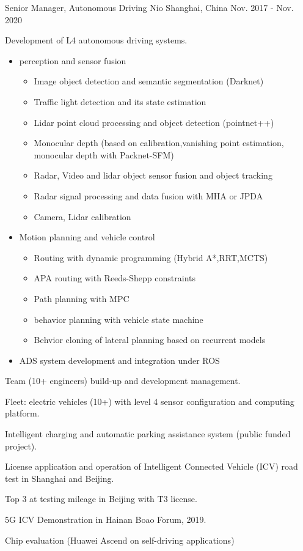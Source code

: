 \documentclass[../cv.tex]{subfiles}
\begin{document}
\begin{cventries}
	\cventry
	{Senior Manager, Autonomous Driving} %
	{Nio} %
	{Shanghai, China} %
	{Nov. 2017 - Nov. 2020} %
	{
		\begin{cvitems}
			\item Development of L4 autonomous driving systems.
			  \begin{itemize}
			    \item perception and sensor fusion
				  \begin{itemize}
					\item Image object detection and semantic segmentation (Darknet)
					\item Traffic light detection and its state estimation
					\item Lidar point cloud processing and object detection (pointnet++)
					\item Monocular depth (based on calibration,vanishing point estimation, monocular depth with Packnet-SFM)
				  	\item Radar, Video and lidar object sensor fusion and object tracking
					\item Radar signal processing and data fusion with MHA or JPDA
					\item Camera, Lidar calibration
				  \end{itemize}
			    \item Motion planning and vehicle control
				  \begin{itemize}
				  	\item Routing with dynamic programming (Hybrid A*,RRT,MCTS)
					\item APA routing with Reeds-Shepp constraints
					\item Path planning with MPC
					\item behavior planning with vehicle state machine
					\item Behvior cloning of lateral planning based on recurrent models
				  \end{itemize}
				\item ADS system development and integration under ROS
			\end{itemize}
			\item Team (10+ engineers) build-up and development management.
			\item Fleet: electric vehicles (10+) with level 4 sensor configuration and computing platform.
			\item Intelligent charging and automatic parking assistance system (public funded project).
			\item License application and operation of Intelligent Connected Vehicle (ICV) road test in Shanghai and Beijing.
			\item Top 3 at testing mileage in Beijing with T3 license.
			\item 5G ICV Demonstration in Hainan Boao Forum, 2019.
			\item Chip evaluation (Huawei Ascend on self-driving applications)
		\end{cvitems}
	}


\end{cventries}
\end{document}
